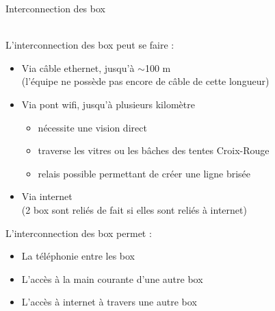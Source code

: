\documentclass{beamer}
\begin{document}
\begin{frame}
    \begin{huge}Interconnection des box\end{huge}
    \vspace{0.5cm}
    \\
    L’interconnection des box peut se faire :
    \begin{itemize}
        \item Via câble ethernet, jusqu’à $\sim$100 m\\
            (l’équipe ne possède pas encore de câble de cette longueur)
        \item Via pont wifi, jusqu’à plusieurs kilomètre\\
            \begin{itemize}
                \item nécessite une vision direct
                \item traverse les vitres ou les bâches des tentes Croix-Rouge
                \item relais possible permettant de créer une ligne brisée
            \end{itemize}
        \item Via internet\\(2 box sont reliés de fait si elles sont reliés à internet)
    \end{itemize}
    L’interconnection des box permet :
    \begin{itemize}
        \item La téléphonie entre les box
        \item L’accès à la main courante d’une autre box
        \item L’accès à internet à travers une autre box
    \end{itemize}
\end{frame}
\end{document}
